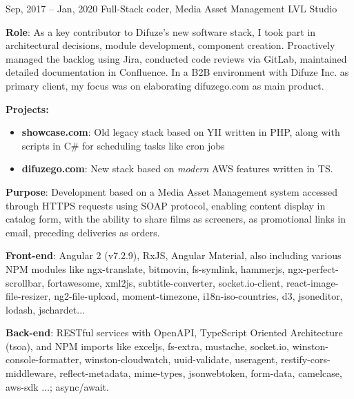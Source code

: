 \documentclass[
  a4paper,
   maincolor=cvblue,
   sectioncolor=cvblue,
   sidebarwidth=0.323\paperwidth,
]{fortysecondscv}
\begin{document}
\begin{cvtableNew}
  \vspace{1mm} %

  \cvitemRightNew
    {Sep, 2017 – Jan, 2020} %
    {Full-Stack coder, Media Asset Management} %
    {LVL Studio} %
      {
        \vspace{0.1pt} %
        \fontsize{10.8pt}{12pt}\selectfont %
        \textbf{Role}: As a key contributor to Difuze’s new software stack, I took part in architectural decisions,
        module development, component creation. Proactively managed the backlog using Jira, conducted code reviews via GitLab, maintained detailed documentation in Confluence. In a B2B environment with Difuze Inc. as primary client, my focus was on elaborating difuzego.com as main product.\vspace{5pt}

        \vspace{0.1pt} %
        \textbf{Projects:}
        \begin{itemize}[itemsep=1mm, topsep=5pt, leftmargin=8pt]
          \item \textbf{showcase.com}: Old legacy stack based on YII written in PHP, along with scripts in C\# for scheduling tasks like cron jobs
          \item \textbf{difuzego.com}: New stack based on \textit{modern} AWS features written in TS.
        \end{itemize}

        \vspace{4pt} %
        \textbf{Purpose}: Development based on a Media Asset Management system accessed through HTTPS requests using SOAP protocol, enabling content display in catalog form, with the ability to share films as screeners, as promotional links in email, preceding deliveries as orders.\vspace{5pt}

        \textbf{Front-end}: Angular 2 (v7.2.9), RxJS, Angular Material, also including various NPM modules like ngx-translate, bitmovin, fs-symlink, hammerjs, ngx-perfect-scrollbar, fortawesome, xml2js, subtitle-converter, socket.io-client, react-image-file-resizer, ng2-file-upload, moment-timezone, i18n-iso-countries, d3, jsoneditor, lodash, jschardet...\vspace{5pt}

        \textbf{Back-end}: RESTful services with OpenAPI, TypeScript Oriented Architecture (tsoa), and NPM imports like exceljs, fs-extra, mustache, socket.io, winston-console-formatter, winston-cloudwatch, uuid-validate, useragent, restify-cors-middleware, reflect-metadata, mime-types, jsonwebtoken, form-data, camelcase, aws-sdk ...; async/await.\vspace{5pt}

}
\end{cvtableNew}
\end{document}

